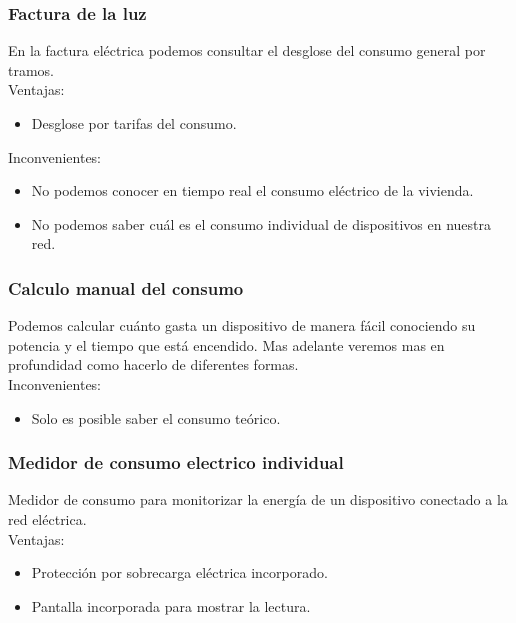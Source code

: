 \begin{titlepage}
\subsubsection{Factura de la luz}
En la factura eléctrica podemos consultar el desglose del consumo general por tramos.\\

Ventajas:
\begin{itemize}
	\item Desglose por tarifas del consumo.
\end{itemize}
Inconvenientes:
\begin{itemize}
	\item No podemos conocer en tiempo real el consumo eléctrico de la vivienda.
	\item No podemos saber cuál es el consumo individual de dispositivos en nuestra red.
\end{itemize}

\subsubsection{Calculo manual del consumo}
Podemos calcular cuánto gasta un dispositivo de manera fácil conociendo su potencia y el tiempo que está encendido. Mas adelante veremos mas en profundidad como hacerlo de diferentes formas.\\

Inconvenientes:\\
\begin{itemize}
	\item Solo es posible saber el consumo teórico.
\end{itemize}

\subsubsection{Medidor de consumo electrico individual}
Medidor de consumo para monitorizar la energía de un dispositivo conectado a la red eléctrica.\\

Ventajas:
\begin{itemize}
	\item Protección por sobrecarga eléctrica incorporado.
	\item Pantalla incorporada para mostrar la lectura.
\end{itemize}


\end{titlepage}
